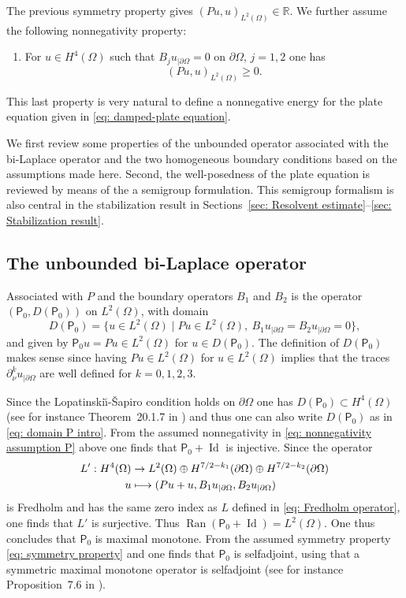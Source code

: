 \documentclass[10pt]{amsart}
\let\sep\mid
\newcommand\mto{\mathchoice{\longmapsto}{\mapsto}{\mapsto}{\mapsto}}
\theoremstyle{plain}
\theoremstyle{definition}
\def\R{\mathbb{R}}
\newcommand{\LS}{Lopatinski\u{\i}-\v{S}apiro\xspace}
\newcommand{\inp}[2]{(#1, #2)}
\newcommand{\Pell}{\mathsf P_0}
\DeclareMathOperator{\id}{Id}
\DeclareMathOperator{\range}{Ran}
\begin{document}
The previous symmetry property gives
$\inp{Pu}{u}_{L^2(\Omega)} \in \R$. We further assume the following
nonnegativity property:
\begin{enumerate}
\item[(iv)] For $u \in H^4(\Omega)$ such that
$B_j u_{|\partial \Omega} = 0$ on $\partial\Omega$, $j=1,2$ one has
\begin{equation}
\label{eq: nonnegativity assumption P}
\inp{Pu}{u}_{L^2(\Omega)}\geq 0.
\end{equation}
\end{enumerate}
This last property is very natural to define a nonnegative energy for the
plate equation given in \eqref{eq: damped-plate equation}.

We first review some properties of the unbounded operator
associated with the bi-Laplace operator and the two homogeneous
boundary conditions based on the assumptions made here. Second,
the well-posedness of the plate equation is reviewed by means of
the a semigroup formulation. This semigroup formalism is also
central in the stabilization result in Sections~\ref{sec: Resolvent estimate}--\ref{sec: Stabilization result}.

\subsection{The unbounded bi-Laplace operator}
\label{sec: unbounded bi-Laplace operator}

Associated with $P$ and the boundary operators $B_1$
and $B_2$ is the operator $(\Pell, D(\Pell))$ on $L^2(\Omega)$, with domain
\begin{equation*}
D(\Pell) = \big\{ u \in L^2(\Omega)\sep P u \in L^2(\Omega), \ B_1
u_{|\partial \Omega}
= B_2 u_{|\partial \Omega}=0\big\},
\end{equation*}
and given by $\Pell u = P u \in L^2(\Omega)$ for $u \in D(\Pell)$.
The definition of $D(\Pell)$ makes sense since having $P u \in
L^2(\Omega)$ for $u \in L^2(\Omega)$ implies that the traces $\partial_\nu^k
u_{|\partial \Omega}$ are well defined for $k=0, 1,2,3$.

Since the \LS condition holds on $\partial \Omega$ one has $D(\Pell)
\subset H^4(\Omega)$ (see for instance Theorem~20.1.7 in
\cite{Hoermander:V3}) and thus one can also write $D(\Pell)$ as in
\eqref{eq: domain P intro}.
From the assumed nonnegativity in \eqref{eq: nonnegativity assumption P} above one finds that
$\Pell + \id$ is injective. Since the operator
\begin{align*}
L': H^4 (\Omega) &\to L^2(\Omega) \oplus H^{7/2-k_1} (\partial \Omega)
\oplus H^{7/2-k_2} (\partial \Omega)\\
u & \mto (Pu +u, B_1 u_{|\partial \Omega} , B_2 u_{|\partial \Omega})
\end{align*}
is Fredholm and has the same zero index as $L$ defined in \eqref{eq:
Fredholm operator}, one finds that $L'$ is surjective. Thus
$\range(\Pell + \id) = L^2(\Omega)$.
One thus concludes that $\Pell$ is maximal monotone.
From the assumed symmetry property \eqref{eq: symmetry property} and
one finds that $\Pell$ is selfadjoint, using
that a symmetric maximal monotone operator is selfadjoint (see for
instance Proposition~7.6 in \cite{Brezis:11}).
\end{document}
